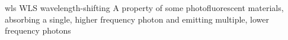 \newglsXacronym%
{wls}%
{WLS}%
{wavelength{\--}shifting}%
{A property of some photofluorescent materials, absorbing a single, higher frequency photon and emitting multiple, lower frequency photons}%